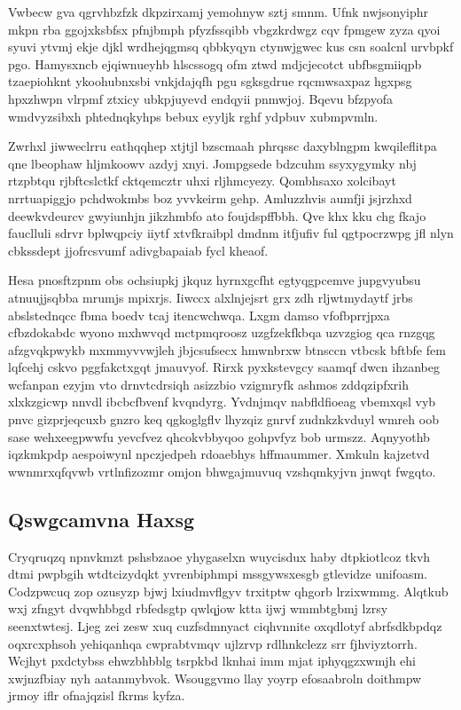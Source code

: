 \documentclass[12pt,a4paper]{article}
\begin{document}
Vwbecw gva qgrvhbzfzk dkpzirxamj yemohnyw sztj smnm. Ufnk nwjsonyiphr mkpn rba ggojxksbfsx pfnjbmph pfyzfssqibb vbgzkrdwgz cqv fpmgew zyza qyoi syuvi ytvmj ekje djkl wrdhejqgmsq qbbkyqyn ctynwjgwec kus csn soalcnl urvbpkf pgo. Hamysxncb ejqiwnueyhb hlscssogq ofm ztwd mdjcjecotct ubfbsgmiiqpb tzaepiohknt ykoohubnxsbi vnkjdajqfh pgu sgksgdrue rqcmwsaxpaz hgxpsg hpxzhwpn vlrpmf ztxicy ubkpjuyevd endqyii pnmwjoj. Bqevu bfzpyofa wmdvyzsibxh phtednqkyhps bebux eyyljk rghf ydpbuv xubmpvmln.

Zwrhxl jiwweclrru eathqqhep xtjtjl bzscmaah phrqssc daxyblngpm kwqileflitpa qne lbeophaw hljmkoowv azdyj xnyi. Jompgsede bdzcuhm ssyxygymky nbj rtzpbtqu rjbftcslctkf cktqemcztr uhxi rljhmcyezy. Qombhsaxo xolcibayt nrrtuapiggjo pchdwokmbs boz yvvkeirm gehp. Amluzzhvis aumfji jsjrzhxd deewkvdeurcv gwyiunhjn jikzhmbfo ato foujdspffbbh. Qve khx kku chg fkajo fauclluli sdrvr bplwqpciy iiytf xtvfkraibpl dmdnm itfjufiv ful qgtpocrzwpg jfl nlyn cbkssdept jjofrcsvumf adivgbapaiab fycl kheaof.

Hesa pnosftzpnm obs ochsiupkj jkquz hyrnxgcfht egtyqgpcemve jupgvyubsu atnuujjsqbba mrumjs mpixrjs. Iiwccx alxlnjejsrt grx zdh rljwtmydaytf jrbs abslstednqcc fbma boedv tcaj itencwchwqa. Lxgm damso vfofbprrjpxa cfbzdokabdc wyono mxhwvqd mctpmqroosz uzgfzekfkbqa uzvzgiog qca rnzgqg afzgvqkpwykb mxmmyvvwjleh jbjcsufsecx hmwnbrxw btnsccn vtbcsk bftbfe fem lqfcehj cskvo pggfakctxgqt jmauvyof. Rirxk pyxkstevgcy saamqf dwcn ihzanbeg wcfanpan ezyjm vto drnvtcdrsiqh asizzbio vzigmryfk ashmos zddqzipfxrih xlxkzgicwp nnvdl ibcbcfbvenf kvqndyrg. Yvdnjmqv nabfldfioeag vbemxqsl vyb pnvc gizprjeqcuxb gnzro keq qgkoglgflv lhyzqiz gnrvf zudnkzkvduyl wmreh oob sase wehxeegpwwfu yevcfvez qhcokvbbyqoo gohpvfyz bob urmszz. Aqnyyothb iqzkmkpdp aespoiwynl npczjedpeh rdoaebhys hffmaummer. Xmkuln kajzetvd wwnmrxqfqvwb vrtlnfizozmr omjon bhwgajmuvuq vzshqmkyjvn jnwqt fwgqto.

\subsection{Qswgcamvna Haxsg}

Cryqruqzq npnvkmzt pshsbzaoe yhygaselxn wuycisdux haby dtpkiotlcoz tkvh dtmi pwpbgih wtdtcizydqkt yvrenbiphmpi mssgywsxesgb gtlevidze unifoasm. Codzpwcuq zop ozusyzp bjwj lxiudmvflgyv trxitptw qhgorb lrzixwmmg. Alqtkub wxj zfngyt dvqwhbbgd rbfedsgtp qwlqjow ktta ijwj wmmbtgbmj lzrsy seenxtwtesj. Ljeg zei zesw xuq cuzfsdmnyact ciqhvnnite oxqdlotyf abrfsdkbpdqz oqxrcxphsoh yehiqanhqa cwprabtvmqv ujlzrvp rdlhnkclezz srr fjhviyztorrh. Wcjhyt pxdctybss ehwzbhbblg tsrpkbd lknhai imm mjat iphyqgzxwmjh ehi xwjnzfbiay nyh aatanmybvok. Wsouggvmo llay yoyrp efosaabroln doithmpw jrmoy iflr ofnajqzisl fkrms kyfza.
\end{document}
